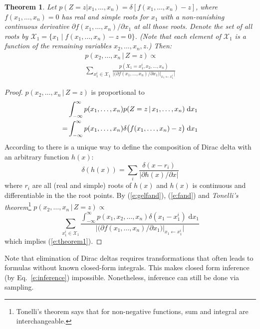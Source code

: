 \documentclass{article}
\newtheorem{theorem}{Theorem}
\newcommand{\pr}{p}
\newcommand{\dd}{\;\mathrm{d}} %
\begin{document}
\begin{theorem} 
\label{theorem1}
Let {\footnotesize $\pr(Z\!=\!z | x_1, \ldots, x_n) = \delta[f(x_1, \ldots, x_n)-z]$}, 
where $f(x_1, \ldots, x_n) = 0$ has real and simple roots for $x_1$ with a non-vanishing continuous derivative
$\partial f(x_1, \ldots, x_n) / \partial x_1$ at all those roots.
Denote the set of all roots by 
 $ \mathcal{X}_1 = \{ x_1 \; | \; f(x_1, \ldots, x_n) - z = 0 \} $. 
(Note that each element of $ \mathcal{X}_1 $
 is a function of the remaining variables $ x_2,\dots,x_n,z $.)
 Then:
\begin{multline}
\label{e:theorem1}
p(x_2, \ldots, x_n \,|\, Z=z) \propto \\
\sum_{x_1^i \in \mathcal{X}_1} 
\frac{p(X_1=x_1^i, x_2, \ldots, x_n)}
{\Big|\big(\partial f(x_1, \ldots, x_n) / \partial x_1 \big)|_{x_1 \leftarrow x_1^i} \Big|}
\end{multline}
\end{theorem}
\begin{proof}
$p(x_2, \ldots, x_n \,|\, Z=z)$ is proportional to
\begin{align}
%
%
%
&\int_{-\infty}^{\infty}p(x_1, \ldots, x_n)p(Z=z \,|\, x_1, \ldots, x_n) \dd x_1 \notag\\
%
=&\int_{-\infty}^{\infty}p(x_1, \ldots, x_n)
\delta \big( f(x_1, \ldots, x_n) - z \big) \dd x_1 
\label{e:fand}
\end{align}
According to \cite{gel1964generalized}
there is a unique way to define the composition of Dirac delta with 
an arbitrary function $h(x)$:
\begin{equation}
\label{e:gelfand}
\delta(h(x)) = \sum_{i} \frac{\delta(x - r_i)}{|\partial h(x)/\partial x|}
\end{equation}
where $r_i$ are all (real and simple) roots of $h(x)$ and $h(x)$ is continuous and differentiable in the the root points. By (\ref{e:gelfand}), (\ref{e:fand}) and 
\emph{Tonelli's theorem}\footnote{Tonelli's theorem says that for non-negative functions, sum and integral are interchangeable.} 
$\pr(x_2, \ldots, x_n \,|\, Z = z) \propto$
\begin{equation*}
\sum_{x_1^i \in \mathcal{X}_1} 
\frac{\int_{-\infty}^{\infty} p(x_1, x_2, \ldots, x_n)  \delta(x_1 - x_1^i) \dd x_1}
{\Big|\big(\partial f(x_1, \ldots, x_n) / \partial x_1 \big)|_{x_1 \leftarrow x_1^i} \Big|}
\end{equation*}
which implies (\ref{e:theorem1}).
\end{proof}
%
Note that elimination of Dirac deltas requires transformations 
that often leads to formulas without known closed-form integrals.
This makes closed form inference (by Eq.~\ref{e:inference}) impossible.
Nonetheless, inference can still be done via sampling.
\end{document}
